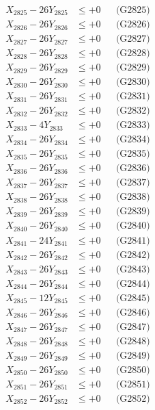 \documentclass[a4paper,10pt]{article}
\begin{document}
{\begin{align}
X_{2825} - 26Y_{2825} &\leq +0 && \text{(G2825)} \\
X_{2826} - 26Y_{2826} &\leq +0 && \text{(G2826)} \\
X_{2827} - 26Y_{2827} &\leq +0 && \text{(G2827)} \\
X_{2828} - 26Y_{2828} &\leq +0 && \text{(G2828)} \\
X_{2829} - 26Y_{2829} &\leq +0 && \text{(G2829)} \\
X_{2830} - 26Y_{2830} &\leq +0 && \text{(G2830)} \\
\allowbreak
X_{2831} - 26Y_{2831} &\leq +0 && \text{(G2831)} \\
X_{2832} - 26Y_{2832} &\leq +0 && \text{(G2832)} \\
X_{2833} - 4Y_{2833} &\leq +0 && \text{(G2833)} \\
X_{2834} - 26Y_{2834} &\leq +0 && \text{(G2834)} \\
X_{2835} - 26Y_{2835} &\leq +0 && \text{(G2835)} \\
X_{2836} - 26Y_{2836} &\leq +0 && \text{(G2836)} \\
X_{2837} - 26Y_{2837} &\leq +0 && \text{(G2837)} \\
X_{2838} - 26Y_{2838} &\leq +0 && \text{(G2838)} \\
X_{2839} - 26Y_{2839} &\leq +0 && \text{(G2839)} \\
X_{2840} - 26Y_{2840} &\leq +0 && \text{(G2840)} \\
\allowbreak
X_{2841} - 24Y_{2841} &\leq +0 && \text{(G2841)} \\
X_{2842} - 26Y_{2842} &\leq +0 && \text{(G2842)} \\
X_{2843} - 26Y_{2843} &\leq +0 && \text{(G2843)} \\
X_{2844} - 26Y_{2844} &\leq +0 && \text{(G2844)} \\
X_{2845} - 12Y_{2845} &\leq +0 && \text{(G2845)} \\
X_{2846} - 26Y_{2846} &\leq +0 && \text{(G2846)} \\
X_{2847} - 26Y_{2847} &\leq +0 && \text{(G2847)} \\
X_{2848} - 26Y_{2848} &\leq +0 && \text{(G2848)} \\
X_{2849} - 26Y_{2849} &\leq +0 && \text{(G2849)} \\
X_{2850} - 26Y_{2850} &\leq +0 && \text{(G2850)} \\
\allowbreak
X_{2851} - 26Y_{2851} &\leq +0 && \text{(G2851)} \\
X_{2852} - 26Y_{2852} &\leq +0 && \text{(G2852)} \\

\end{align}}
\end{document}
